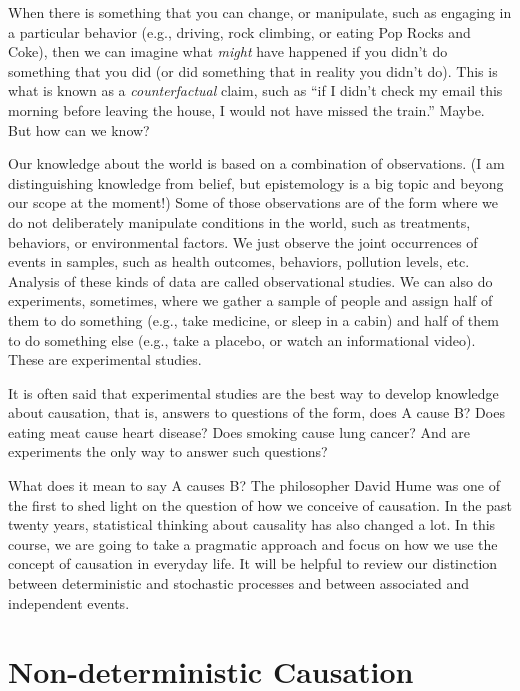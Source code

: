 \documentclass[openany]{book}
\begin{document}
When there is something that you can change, or manipulate, such as engaging in a particular behavior (e.g., driving, rock climbing, or eating Pop Rocks and Coke), then we can imagine what \emph{might} have happened if you didn't do something that you did (or did something that in reality you didn't do). This is what is known as a \emph{counterfactual} claim, such as ``if I didn't check my email this morning before leaving the house, I would not have missed the train.'' Maybe. But how can we know?

Our knowledge about the world is based on a combination of observations. (I am distinguishing knowledge from belief, but epistemology is a big topic and beyong our scope at the moment!) Some of those observations are of the form where we do not deliberately manipulate conditions in the world, such as treatments, behaviors, or environmental factors. We just observe the joint occurrences of events in samples, such as health outcomes, behaviors, pollution levels, etc. Analysis of these kinds of data are called observational studies. We can also do experiments, sometimes, where we gather a sample of people and assign half of them to do something (e.g., take medicine, or sleep in a cabin) and half of them to do something else (e.g., take a placebo, or watch an informational video). These are experimental studies.

It is often said that experimental studies are the best way to develop knowledge about causation, that is, answers to questions of the form, does A cause B? Does eating meat cause heart disease? Does smoking cause lung cancer? And are experiments the only way to answer such questions?

What does it mean to say A causes B? The philosopher David Hume was one of the first to shed light on the question of how we conceive of causation. In the past twenty years, statistical thinking about causality has also changed a lot. In this course, we are going to take a pragmatic approach and focus on how we use the concept of causation in everyday life. It will be helpful to review our distinction between deterministic and stochastic processes and between associated and independent events.

\hypertarget{non-deterministic-causation}{%
\section*{Non-deterministic Causation}\label{non-deterministic-causation}}
\end{document}

